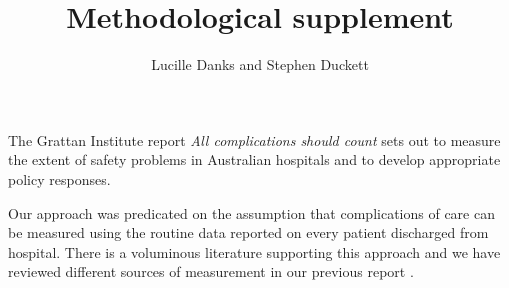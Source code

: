 \documentclass[submission]{grattan}
\title{Methodological supplement}
\author{Lucille Danks and Stephen Duckett}
\newcommand*{\myTitle}{All complications should count}
\begin{document}
\setlength{\textfloatsep}{1.6\baselineskip}
\contentspage
\listoffigures









The Grattan Institute report \textit{\myTitle} sets out to measure the extent of safety problems in Australian hospitals and to develop appropriate policy responses.

Our approach was predicated on the assumption that complications of care can be measured using the routine data reported on every patient discharged from hospital.
There is a voluminous literature supporting this approach and we have reviewed different sources of measurement in our previous report .
\end{document}
